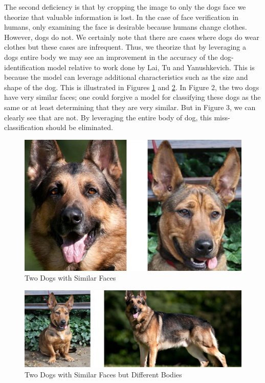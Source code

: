 \documentclass{article}
\begin{document}
The second deficiency is that by cropping the image to only the dogs face we theorize that valuable information is lost.  In the case of face verification in humans, only examining the face is desirable because humans change clothes.  However, dogs do not.  We certainly note that there are cases where dogs do wear clothes but these cases are infrequent.  Thus, we theorize that by leveraging a dogs entire body we may see an improvement in the accuracy of the dog-identification model relative to work done by  Lai, Tu and Yanushkevich.  This is because the model can leverage additional characteristics such as the size and shape of the dog.  This is illustrated in Figures \ref{fig:x similar faces} and \ref{fig:x different bodies}.  In Figure 2, the two dogs have very similar faces; one could forgive a model for classifying these dogs as the same or at least determining that they are very similar.  But in Figure 3, we can clearly see that are not.  By leveraging the entire body of dog, this miss-classification should be eliminated.

\begin{figure}[h]
\centering
	\includegraphics{final-report-images/similar_faces.png}
\caption{Two Dogs with Similar Faces}
\label{fig:x similar faces}
\end{figure}


\begin{figure}[h]
\centering
	\includegraphics{final-report-images/different_bodies.png}
\caption{Two Dogs with Similar Faces but Different Bodies}
\label{fig:x different bodies}
\end{figure}
\end{document}
